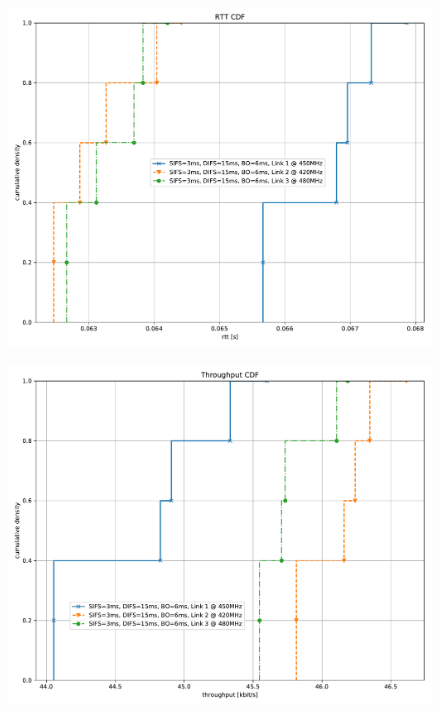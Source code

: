\documentclass{article}
\begin{document}
\begin{figure}
	\includegraphics[width=\textwidth]{rb_single/cdf/rtt_cdf}
\end{figure}

\begin{figure}
	\includegraphics[width=\textwidth]{rb_single/cdf/throughput_cdf}
\end{figure}
\end{document}

